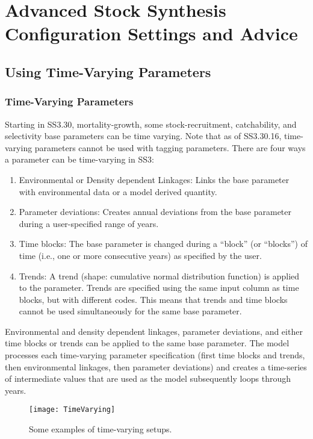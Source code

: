 \section{Advanced Stock Synthesis Configuration Settings and Advice}

\hypertarget{TVpara}{}
\subsection{Using Time-Varying Parameters}

\hypertarget{tvOrder}{}
\subsubsection{Time-Varying Parameters}

Starting in SS3.30, mortality-growth, some stock-recruitment, catchability, and selectivity base parameters can be time varying. Note that as of SS3.30.16, time-varying parameters cannot be used with tagging parameters. There are four ways a parameter can be time-varying in SS3:
\begin{enumerate}
    \item Environmental or Density dependent Linkages: Links the base parameter with environmental data or a model derived quantity.
	\item Parameter deviations: Creates annual deviations from the base parameter during a user-specified range of years.
	\item Time blocks: The base parameter is changed during a ``block'' (or ``blocks'') of time (i.e., one or more consecutive years) as specified by the user.
	\item Trends: A trend (shape: cumulative normal distribution function) is applied to the parameter. Trends are specified using the same input column as time blocks, but with different codes. This means that trends and time blocks cannot be used simultaneously for the same base parameter.
\end{enumerate}

Environmental and density dependent linkages, parameter deviations, and either time blocks or trends can be applied to the same base parameter. The model processes each time-varying parameter specification (first time blocks and trends, then environmental linkages, then parameter deviations) and creates a time-series of intermediate values that are used as the model subsequently loops through years.

\begin{figure}[ht]
	\begin{center}
		\texttt{[image: TimeVarying]}\\
	\end{center}
	\caption{Some examples of time-varying setups.}
	\label{(fig:timevarying)}
\end{figure}

